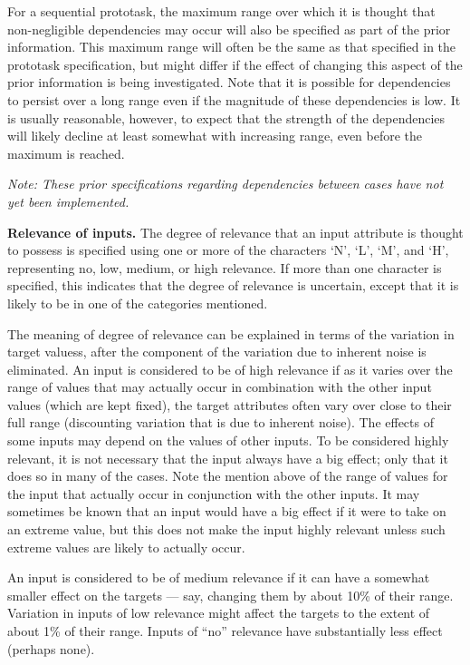 For a sequential prototask, the maximum range over which it is thought
that non-negligible dependencies may occur will also be specified as
part of the prior information.  This maximum range will often be the
same as that specified in the prototask specification, but might
differ if the effect of changing this aspect of the prior information
is being investigated.  Note that it is possible for dependencies to
persist over a long range even if the magnitude of these dependencies
is low.  It is usually reasonable, however, to expect that the
strength of the dependencies will likely decline at least somewhat
with increasing range, even before the maximum is reached.

{\em Note: These prior specifications regarding dependencies between
cases have not yet been implemented.}

{\bf Relevance of inputs.\/} The degree of relevance that an input
attribute is thought to possess is specified using one or more of the
characters `N', `L', `M', and `H', representing no, low,
medium, or high relevance.  If more than one character is specified,
this indicates that the degree of relevance is uncertain, except that
it is likely to be in one of the categories mentioned.

The meaning of degree of relevance can be explained in terms of the
variation in target valuess, after the component of the variation due
to inherent noise is eliminated.  An input is considered to be of high
relevance if as it varies over the range of values that may actually
occur in combination with the other input values (which are kept
fixed), the target attributes often vary over close to their full
range (discounting variation that is due to inherent noise).  The
effects of some inputs may depend on the values of other inputs.  To
be considered highly relevant, it is not necessary that the input
always have a big effect; only that it does so in many of the cases.
Note the mention above of the range of values for the input that
actually occur in conjunction with the other inputs.  It may sometimes
be known that an input would have a big effect if it were to take on
an extreme value, but this does not make the input highly relevant
unless such extreme values are likely to actually occur.

An input is considered to be of medium relevance if it can have a
somewhat smaller effect on the targets --- say, changing them by about
10\% of their range.  Variation in inputs of low relevance might
affect the targets to the extent of about 1\% of their range.  Inputs
of ``no'' relevance have substantially less effect (perhaps none).


